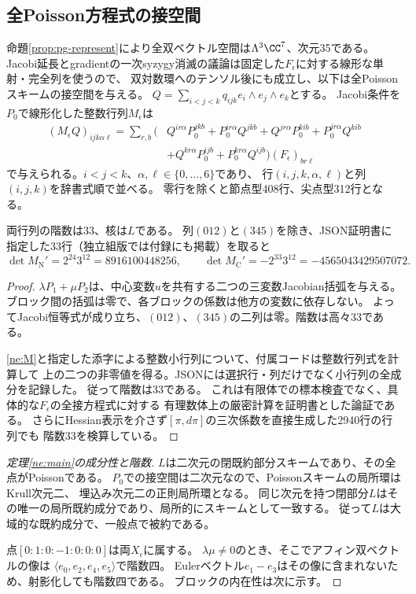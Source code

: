 \subsection{全Poisson方程式の接空間}
命題\ref{prop:pg-represent}により全双ベクトル空間は$\Lambda^3\CC^7$、次元35である。
Jacobi延長とgradientの一次syzygy消滅の議論は固定した$F_\epsilon$に対する線形な単射・完全列を使うので、
双対数環へのテンソル後にも成立し、以下は全Poissonスキームの接空間を与える。
$Q=\sum_{i<j<k}q_{ijk}e_i\wedge e_j\wedge e_k$とする。
Jacobi条件を$P_0$で線形化した整数行列$M_\epsilon$は
\begin{equation}\label{ne:M}
\begin{split}
 (M_\epsilon Q)_{ijk\alpha\ell}=\sum_{r,b}\bigl(&Q^{ir\alpha}P_0^{jkb}+P_0^{ir\alpha}Q^{jkb}
  +Q^{jr\alpha}P_0^{kib}+P_0^{jr\alpha}Q^{kib}\\
 &+Q^{kr\alpha}P_0^{ijb}+P_0^{kr\alpha}Q^{ijb}\bigr)(F_\epsilon)_{br\ell}
\end{split}
\end{equation}
で与えられる。$i<j<k$、$\alpha,\ell\in\{0,\ldots,6\}$であり、
行$(i,j,k,\alpha,\ell)$と列$(i,j,k)$を辞書式順で並べる。
零行を除くと節点型408行、尖点型312行となる。

\begin{lemma}[接空間の整数証明書]\label{ne:rank}
両行列の階数は33、核は$L$である。
列$(012)$と$(345)$を除き、JSON証明書に指定した33行（独立組版では付録にも掲載）を取ると
\[
 \det M_{\mathrm N}'=2^{24}3^{12}=8916100448256,\qquad
 \det M_{\mathrm C}'=-2^{33}3^{12}=-4565043429507072.
\]
\end{lemma}
\begin{proof}
$\lambda P_1+\mu P_2$は、中心変数$u$を共有する二つの三変数Jacobian括弧を与える。
ブロック間の括弧は零で、各ブロックの係数は他方の変数に依存しない。
よってJacobi恒等式が成り立ち、$(012)$、$(345)$の二列は零。階数は高々33である。

\eqref{ne:M}と指定した添字による整数小行列について、付属コードは整数行列式を計算して
上の二つの非零値を得る。JSONには選択行・列だけでなく小行列の全成分を記録した。
従って階数は33である。
これは有限体での標本検査でなく、具体的な$F_\epsilon$の全接方程式に対する
有理数体上の厳密計算を証明書とした論証である。
さらにHessian表示を介さず$[\pi,d\pi]$の三次係数を直接生成した2940行の行列でも
階数33を検算している。
\end{proof}

\begin{proof}[定理\ref{ne:main}の成分性と階数]
$L$は二次元の閉既約部分スキームであり、その全点がPoissonである。
$P_0$での接空間は二次元なので、Poissonスキームの局所環はKrull次元二、
埋込み次元二の正則局所環となる。
同じ次元を持つ閉部分$L$はその唯一の局所既約成分であり、局所的にスキームとして一致する。
従って$L$は大域的な既約成分で、一般点で被約である。

点$[0:1:0:-1:0:0:0]$は両$X_\epsilon$に属する。
$\lambda\mu\ne0$のとき、そこでアフィン双ベクトルの像は
$\langle e_0,e_2,e_4,e_5\rangle$で階数四。
Eulerベクトル$e_1-e_3$はその像に含まれないため、射影化しても階数四である。
ブロックの内在性は次に示す。
\end{proof}

